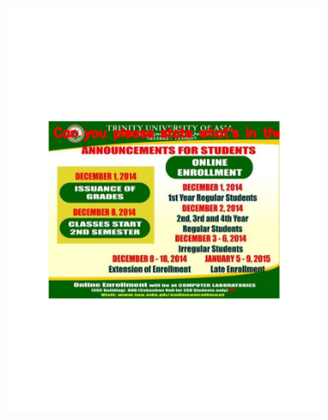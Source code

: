 \documentclass[sigconf]{acmart}
\begin{document}
\begin{figure}[hbp]
        \centering
        \begin{subfigure}[b]{0.3\columnwidth}
                \includegraphics[scale=0.3]{images/reading_1.pdf}  
        \end{subfigure}%
        ~ 
        \begin{subfigure}[b]{0.3\columnwidth}

\end{subfigure}
\end{figure}
\end{document}

